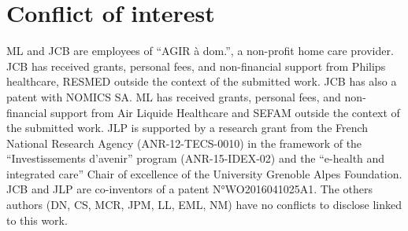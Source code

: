 \section{Conflict of interest}
\par ML and JCB are employees of “AGIR à dom.”, a non-profit home care provider. JCB has received grants, personal fees, and non-financial support from Philips healthcare, RESMED outside the context of the submitted work. JCB has also a patent with NOMICS SA. ML has received grants, personal fees, and non-financial support from Air Liquide Healthcare and SEFAM outside the context of the submitted work. JLP is  supported by a research grant from the French National Research Agency (ANR-12-TECS-0010) in the framework of the “Investissements d’avenir” program (ANR-15-IDEX-02) and the “e-health and integrated care” Chair of excellence of the University Grenoble Alpes Foundation. JCB and JLP are co-inventors of a patent N°WO2016041025A1. The others authors (DN, CS, MCR, JPM, LL, EML, NM) have no conflicts to disclose linked to this work.\par
